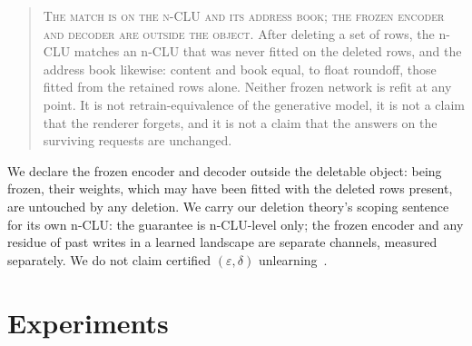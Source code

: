 \documentclass{article} %
\begin{document}
\begin{quote}\small
\textsc{The match is on the n-CLU and its address book; the frozen encoder and decoder are outside
the object.} After deleting a set of rows, the n-CLU matches an n-CLU that was never fitted on the
deleted rows, and the address book likewise: content and book equal, to float roundoff, those fitted
from the retained rows alone. Neither frozen network is refit at any point. It is
not retrain-equivalence of the generative model, it is not a claim that the renderer forgets, and it
is not a claim that the answers on the surviving requests are unchanged.
\end{quote}

\noindent We declare the frozen encoder and decoder outside the deletable object: being frozen,
their weights, which may have been fitted with the deleted rows present, are untouched by any deletion.
We carry our deletion theory's scoping sentence for its own n-CLU: the guarantee
is n-CLU-level only; the frozen encoder and any residue of past writes in a learned
landscape are separate channels, measured separately. We do not claim certified
$(\varepsilon,\delta)$ unlearning~\citep{guo_certified_2023}. %

\section{Experiments}
\label{sec:experiments}
\end{document}
